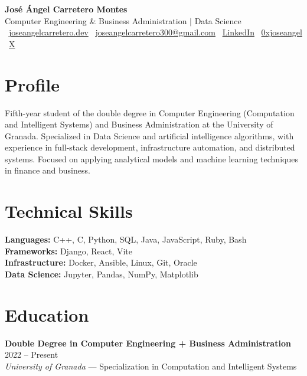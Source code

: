 \documentclass[12pt,a4paper]{article}
\begin{document}
\begin{center}
  {\LARGE\bfseries José Ángel Carretero Montes}\\[6pt]
  {\normalsize Computer Engineering \& Business Administration $\mid$ Data Science}\\[8pt]
  \footnotesize
  \faGlobe\ \href{https://joseangelcarretero.dev}{joseangelcarretero.dev} \hspace{6pt}
  \faEnvelope\ \href{mailto:joseangelcarretero300@gmail.com}{joseangelcarretero300@gmail.com} \hspace{6pt}
  \faLinkedin\ \href{https://www.linkedin.com/in/jos\%C3\%A9-\%C3\%A1ngel-carretero-montes-476008202/}{LinkedIn} \hspace{6pt}
  \faGithub\ \href{https://github.com/0xjoseangel}{0xjoseangel} \hspace{6pt}
  \faTwitter\ \href{https://x.com/0xjoseangel}{X}
\end{center}

\section{Profile}
Fifth-year student of the double degree in Computer Engineering (Computation and Intelligent Systems) and Business Administration at the University of Granada. Specialized in Data Science and artificial intelligence algorithms, with experience in full-stack development, infrastructure automation, and distributed systems. Focused on applying analytical models and machine learning techniques in finance and business.

\section{Technical Skills}
\textbf{Languages:} C++, C, Python, SQL, Java, JavaScript, Ruby, Bash \\
\textbf{Frameworks:} Django, React, Vite \\
\textbf{Infrastructure:} Docker, Ansible, Linux, Git, Oracle \\
\textbf{Data Science:} Jupyter, Pandas, NumPy, Matplotlib

\section{Education}
\textbf{Double Degree in Computer Engineering + Business Administration} \hfill 2022 -- Present \\
\textit{University of Granada} --- Specialization in Computation and Intelligent Systems
\end{document}
